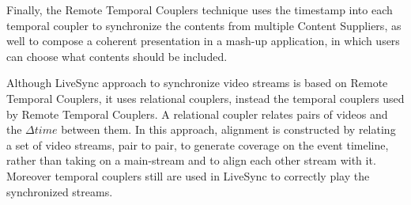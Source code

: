 Finally, the Remote Temporal Couplers technique uses the timestamp into each temporal coupler to synchronize the contents from multiple Content Suppliers, as well to compose a coherent presentation in a mash-up application, in which users can choose what contents should be included.

Although LiveSync approach to synchronize video streams is based on Remote Temporal Couplers, it uses relational couplers, instead the temporal couplers used by Remote Temporal Couplers. A relational coupler relates pairs of videos and the $\Delta{time}$ between them. In this approach, alignment is constructed by relating a set of video streams, pair to pair, to generate coverage on the event timeline, rather than taking on a main-stream and to align each other stream with it. Moreover temporal couplers still are used in LiveSync to correctly play the synchronized streams.










